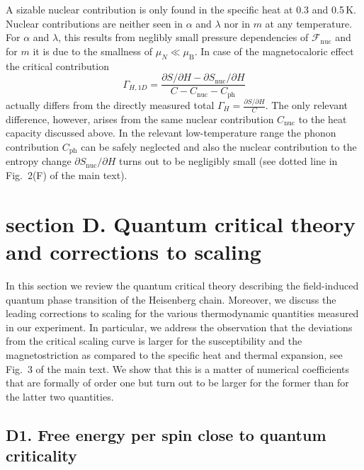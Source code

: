 \documentclass[12pt]{article}
\begin{document}
A sizable nuclear contribution is only found in the specific heat at 0.3 and 0.5\,K. Nuclear contributions are neither seen in $\alpha $ and $\lambda$ nor in $m$ at any temperature. For $\alpha $ and $\lambda$, this results from neglibly small pressure dependencies of $\mathcal{F}_\mathrm{nuc}$ and for $m$ it is due to the smallness of $\mu_N \ll \mu_\mathrm{B}$. In case of the magnetocaloric effect the critical contribution
\begin{equation}
 \Gamma_{H,1D}=\frac{\partial S/\partial H - \partial S_\mathrm{nuc}/\partial H}{C-C_\mathrm{nuc}-C_\mathrm{ph}}
\end{equation}
actually differs from the directly measured total $\Gamma_H=\frac{\partial S/\partial H}{C}$. The only relevant difference, however,  arises from the same nuclear contribution $C_\mathrm{nuc}$ to the heat capacity discussed above. In the relevant low-temperature range the phonon contribution $C_\mathrm{ph}$ can be safely neglected and also the nuclear contribution to the entropy change $\partial S_\mathrm{nuc}/\partial H$ turns out to be negligibly small (see dotted line in Fig.~2(F) of the main text). 


\section*{section D. Quantum critical theory and corrections to scaling}

In this section we review the quantum critical theory describing the field-induced quantum phase transition of the Heisenberg chain. Moreover, we discuss the leading  corrections to scaling for the various thermodynamic quantities measured in our experiment. In particular, we address the  observation that the deviations from the critical scaling curve is larger for the susceptibility and the magnetostriction as compared to the specific heat and thermal expansion, see Fig.~3 of the main text. We show that this is a matter of numerical coefficients that are formally of order one but turn out to be larger for the former than for the latter two quantities. 

\subsection*{D1. Free energy per spin close to quantum criticality}
\end{document}
